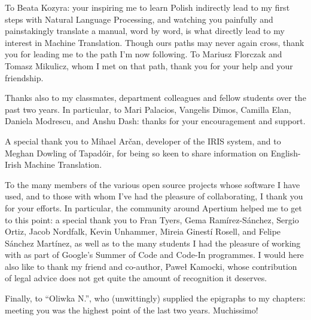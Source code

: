 \documentclass[withindex,glossary,times]{tcd-dissertation}
\begin{document}
{To Beata Kozyra: your inspiring me to learn Polish indirectly lead to my
first steps with Natural Language Processing, and watching you painfully
and painstakingly translate a manual, word by word, is what directly lead to my
interest in Machine Translation. Though ours paths may never again cross,
thank you for leading me to the path I'm now following. To Mariusz Florczak
and Tomasz Mikulicz, whom I met on that path, thank you for your help and
your friendship.

Thanks also to my classmates, department colleagues and fellow students over the past two
years. In particular, to Mari Palacios, Vangelis Dimos, Camilla Elan, 
Daniela Modrescu, and Anshu Dash: thanks for your encouragement and support.

A special thank you to Mihael Ar\v{c}an, developer of the IRIS system, and
to Meghan Dowling of Tapad\'oir, for being so keen to share information on
English-Irish Machine Translation.

To the many members of the various open source projects whose software I have
used, and to those with whom I've had the pleasure of collaborating, I thank 
you for your efforts. In particular, the community around Apertium helped
me to get to this point: a special thank you to Fran Tyers, Gema Ram\'irez-S\'anchez,
Sergio Ortiz, Jacob Nordfalk, Kevin Unhammer, Mireia Ginest\'i Rosell, and
Felipe S\'anchez Mart\'inez, as well as to the many students I had the pleasure
of working with as part of Google's Summer of Code and Code-In programmes. I
would here also like to thank my friend and co-author, Pawe\l{} Kamocki, whose
contribution of legal advice does not get quite the amount of recognition it
deserves.

Finally, to ``Oliwka N.'', who (unwittingly) supplied the epigraphs to my chapters:
meeting you was the highest point of the last two years. Muchissimo!

}

\frontmatter{}










\cleardoublepage
{}
{}





\appendix






\printthesisindex
\end{document}
